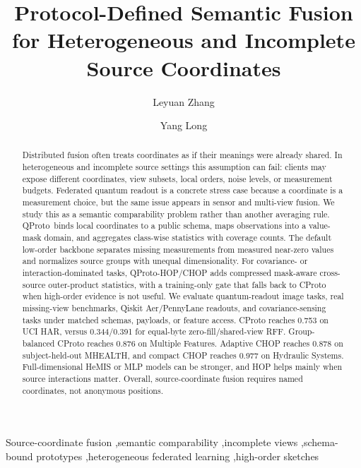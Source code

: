 \documentclass[preprint]{elsarticle}
\newcommand{\method}{QProto}
\newcommand{\hopmethod}{QProto-HOP}
\begin{document}
\begin{frontmatter}

\title{Protocol-Defined Semantic Fusion for Heterogeneous and Incomplete Source Coordinates}

\author[inst1]{Leyuan Zhang}
\author[inst1]{Yang Long}
\address[inst1]{Department of Computer Science, Durham University, Durham, United Kingdom}

\begin{abstract}
Distributed fusion often treats coordinates as if their meanings were already shared. In heterogeneous and incomplete source settings this assumption can fail: clients may expose different coordinates, view subsets, local orders, noise levels, or measurement budgets. Federated quantum readout is a concrete stress case because a coordinate is a measurement choice, but the same issue appears in sensor and multi-view fusion. We study this as a semantic comparability problem rather than another averaging rule. \method\ binds local coordinates to a public schema, maps observations into a value-mask domain, and aggregates class-wise statistics with coverage counts. The default low-order backbone separates missing measurements from measured near-zero values and normalizes source groups with unequal dimensionality. For covariance- or interaction-dominated tasks, \hopmethod/CHOP adds compressed mask-aware cross-source outer-product statistics, with a training-only gate that falls back to CProto when high-order evidence is not useful. We evaluate quantum-readout image tasks, real missing-view benchmarks, Qiskit Aer/PennyLane readouts, and covariance-sensing tasks under matched schemas, payloads, or feature access. CProto reaches 0.753 on UCI HAR, versus 0.344/0.391 for equal-byte zero-fill/shared-view RFF. Group-balanced CProto reaches 0.876 on Multiple Features. Adaptive CHOP reaches 0.878 on subject-held-out MHEALTH, and compact CHOP reaches 0.977 on Hydraulic Systems. Full-dimensional HeMIS or MLP models can be stronger, and HOP helps mainly when source interactions matter. Overall, source-coordinate fusion requires named coordinates, not anonymous positions.
\end{abstract}

\begin{keyword}
Source-coordinate fusion \sep semantic comparability \sep incomplete views \sep schema-bound prototypes \sep heterogeneous federated learning \sep high-order sketches
\end{keyword}

\end{frontmatter}
\end{document}
